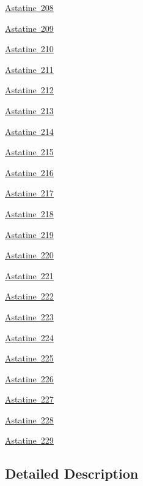 \begin{DoxyCompactItemize}
\mbox{\hyperlink{group___isotope_const-_astatine-_at208}{Astatine 208}}
\item 
\mbox{\hyperlink{group___isotope_const-_astatine-_at209}{Astatine 209}}
\item 
\mbox{\hyperlink{group___isotope_const-_astatine-_at210}{Astatine 210}}
\item 
\mbox{\hyperlink{group___isotope_const-_astatine-_at211}{Astatine 211}}
\item 
\mbox{\hyperlink{group___isotope_const-_astatine-_at212}{Astatine 212}}
\item 
\mbox{\hyperlink{group___isotope_const-_astatine-_at213}{Astatine 213}}
\item 
\mbox{\hyperlink{group___isotope_const-_astatine-_at214}{Astatine 214}}
\item 
\mbox{\hyperlink{group___isotope_const-_astatine-_at215}{Astatine 215}}
\item 
\mbox{\hyperlink{group___isotope_const-_astatine-_at216}{Astatine 216}}
\item 
\mbox{\hyperlink{group___isotope_const-_astatine-_at217}{Astatine 217}}
\item 
\mbox{\hyperlink{group___isotope_const-_astatine-_at218}{Astatine 218}}
\item 
\mbox{\hyperlink{group___isotope_const-_astatine-_at219}{Astatine 219}}
\item 
\mbox{\hyperlink{group___isotope_const-_astatine-_at220}{Astatine 220}}
\item 
\mbox{\hyperlink{group___isotope_const-_astatine-_at221}{Astatine 221}}
\item 
\mbox{\hyperlink{group___isotope_const-_astatine-_at222}{Astatine 222}}
\item 
\mbox{\hyperlink{group___isotope_const-_astatine-_at223}{Astatine 223}}
\item 
\mbox{\hyperlink{group___isotope_const-_astatine-_at224}{Astatine 224}}
\item 
\mbox{\hyperlink{group___isotope_const-_astatine-_at225}{Astatine 225}}
\item 
\mbox{\hyperlink{group___isotope_const-_astatine-_at226}{Astatine 226}}
\item 
\mbox{\hyperlink{group___isotope_const-_astatine-_at227}{Astatine 227}}
\item 
\mbox{\hyperlink{group___isotope_const-_astatine-_at228}{Astatine 228}}
\item 
\mbox{\hyperlink{group___isotope_const-_astatine-_at229}{Astatine 229}}
\end{DoxyCompactItemize}


\subsection{Detailed Description}
